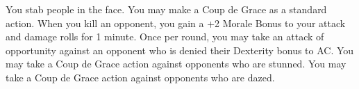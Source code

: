 {You stab people in the face.}
{You may make a Coup de Grace as a standard action.}
{When you kill an opponent, you gain a +2 Morale Bonus to your attack and damage rolls for 1 minute.}
{Once per round, you may take an attack of opportunity against an opponent who is denied their Dexterity bonus to AC.}
{You may take a Coup de Grace action against opponents who are stunned.}
{You may take a Coup de Grace action against opponents who are dazed.}